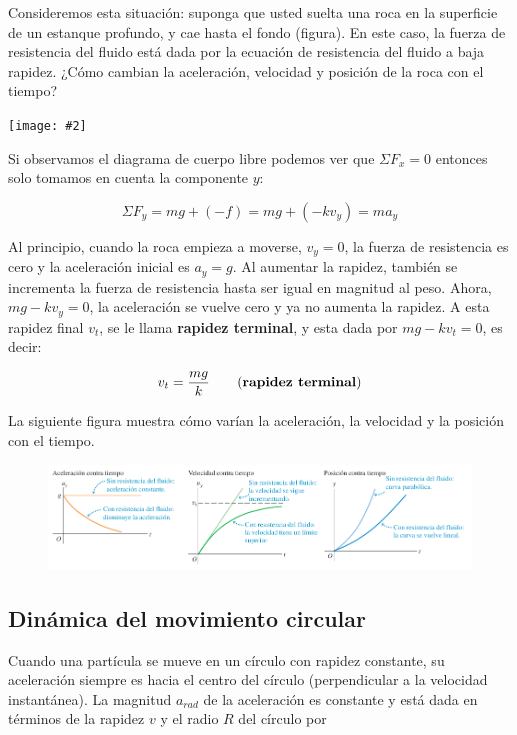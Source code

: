 \documentclass{article}
\newcommand{\newsubsection}[1]{
    \vspace{0.5cm}
    \color{sectionColor}
    \subsection{ #1}
    \color{black}
    \vspace{0.5cm}
}
\newcommand{\bl}[1]{\textbf{#1}}
\newcommand{\ladoALado}[4]{
    \begin{minipage}[t]{#3\textwidth}
        \vspace{0pt}
        #1
    \end{minipage}
    \hfill
    \begin{minipage}[t]{#4\textwidth}
        \vspace{0pt}
        \centering
        \texttt{[image: \#2]}
    \end{minipage}
}
\begin{document}
    \ladoALado{
        \par Consideremos esta situación: suponga que usted suelta una roca en la superficie de un estanque profundo, y cae hasta el fondo (figura). En este caso, la fuerza de resistencia del fluido está dada por la ecuación de resistencia del fluido a baja rapidez. ¿Cómo cambian la aceleración, velocidad y posición de la roca con el tiempo?
    }{img/3.3-6.png}{0.6}{0.4}

    \par Si observamos el diagrama de cuerpo libre podemos ver que $\Sigma F_x = 0$ entonces solo tomamos en cuenta la componente $y$:

    \[ \Sigma F_y = mg + (-f) = mg + (-kv_y) = ma_y \]

    \par Al principio, cuando la roca empieza a moverse, $v_y = 0$, la fuerza de resistencia es cero y la aceleración inicial es $a_y = g$. Al aumentar la rapidez, también se incrementa la fuerza de resistencia hasta ser igual en magnitud al peso. Ahora, $mg - kv_y = 0$, la aceleración se vuelve cero y ya no aumenta la rapidez. A esta rapidez final $v_t$, se le llama \bl{rapidez terminal}, y esta dada por $mg - kv_t = 0$, es decir:

    \[ v_t = \frac{mg}{k} \quad \quad \text{(\bl{rapidez terminal})} \]

    \par La siguiente figura muestra cómo varían la aceleración, la velocidad y la posición con el tiempo.

    \begin{figure}[H]
        \centering
        \includegraphics[width=\textwidth]{img/3.3-7.png}
    \end{figure}

    \newsubsection{Dinámica del movimiento circular}

    \par Cuando una partícula se mueve en un círculo con rapidez constante, su aceleración siempre es hacia el centro del círculo (perpendicular a la velocidad instantánea). La magnitud $a_{rad}$ de la aceleración es constante y está dada en términos de la rapidez $v$ y el radio $R$ del círculo por
\end{document}
